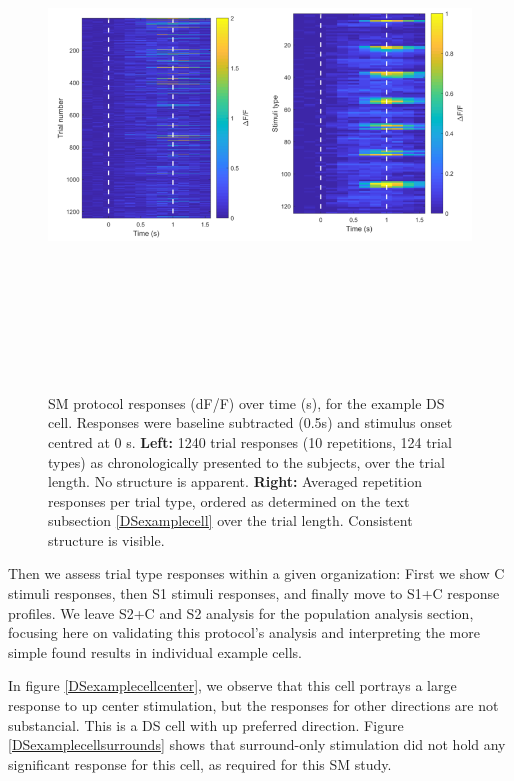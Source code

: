 \begin{figure}[H] \centering \includegraphics[width=14cm,height=14cm,keepaspectratio]{Figures/7.Results/individualSM/roi_29_mf379_pos5/roi29.png} 
\caption{SM protocol responses (dF/F) over time (s), for the example DS cell. Responses were baseline subtracted (0.5s) and stimulus onset centred at 0 s.
\newline \textbf{Left:} 1240 trial responses (10 repetitions, 124 trial types) as chronologically presented to the subjects, over the trial length. No structure is apparent.
\newline \textbf{Right:} Averaged repetition responses per trial type, ordered as determined on the text subsection \ref{DSexamplecell} over the trial length. Consistent structure is visible.}
\label{individualDStrials}
\end{figure}

Then we assess trial type responses within a given organization: First we show C stimuli responses, then S1 stimuli responses, and finally move to S1+C response profiles. We leave S2+C and S2 analysis for the population analysis section, focusing here on validating this protocol's analysis and interpreting the more simple found results in individual example cells.

In figure \ref{DSexamplecellcenter}, we observe that this cell portrays a large response to up center stimulation, but the responses for other directions are not substancial. This is a DS cell with up preferred direction. Figure \ref{DSexamplecellsurrounds} shows that surround-only stimulation did not hold any significant response for this cell, as required for this SM study.

